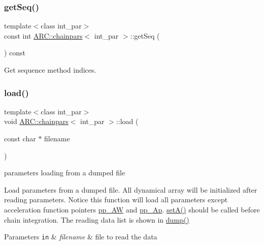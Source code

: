 \hypertarget{classARC_1_1chainpars_af38efb14e24c1e85d48c8e6bbfa7479a}{}\label{classARC_1_1chainpars_af38efb14e24c1e85d48c8e6bbfa7479a} 
\subsubsection{\texorpdfstring{get\+Seq()}{getSeq()}}
{\footnotesize\ttfamily template$<$class int\+\_\+par$>$ \\
const int \hyperlink{classARC_1_1chainpars}{A\+R\+C\+::chainpars}$<$ int\+\_\+par $>$\+::get\+Seq (\begin{DoxyParamCaption}{ }\end{DoxyParamCaption}) const\hspace{0.3cm}{\ttfamily [inline]}}



Get sequence method indices. 

\hypertarget{classARC_1_1chainpars_ab0fce7efd7c43dffb1677a5bfb81ab93}{}\label{classARC_1_1chainpars_ab0fce7efd7c43dffb1677a5bfb81ab93} 
\subsubsection{\texorpdfstring{load()}{load()}}
{\footnotesize\ttfamily template$<$class int\+\_\+par$>$ \\
void \hyperlink{classARC_1_1chainpars}{A\+R\+C\+::chainpars}$<$ int\+\_\+par $>$\+::load (\begin{DoxyParamCaption}\item[{const char $\ast$}]{filename }\end{DoxyParamCaption})\hspace{0.3cm}{\ttfamily [inline]}}



parameters loading from a dumped file 

Load parameters from a dumped file. All dynamical array will be initialized after reading parameters. Notice this function will load all parameters except acceleration function pointers \hyperlink{classARC_1_1chainpars_a4be95af92d02bd0600b0983568f6eedb}{pp\+\_\+\+AW} and \hyperlink{classARC_1_1chainpars_a7a12864e60dfa03ff5a258cf0eb472e8}{pp\+\_\+\+Ap}. \hyperlink{classARC_1_1chainpars_a8fb0855614ac2b2e527c43ce5d66ca0d}{set\+A()} should be called before chain integration. The reading data list is shown in \hyperlink{classARC_1_1chainpars_ad9b13829dde6cee409f807c2237e5dbd}{dump()} 
\begin{DoxyParams}[1]{Parameters}
\mbox{\tt in}  & {\em filename} & file to read the data \\
\hline
\end{DoxyParams}
\hypertarget{classARC_1_1chainpars_a0bd63efbb21ff851fc4632c43df544e5}{}\label{classARC_1_1chainpars_a0bd63efbb21ff851fc4632c43df544e5} 
